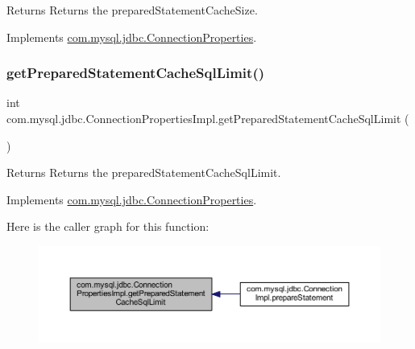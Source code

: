 \begin{DoxyReturn}{Returns}
Returns the prepared\+Statement\+Cache\+Size. 
\end{DoxyReturn}


Implements \mbox{\hyperlink{interfacecom_1_1mysql_1_1jdbc_1_1_connection_properties_ad0bf062f59dcc82790e2d539c3a79924}{com.\+mysql.\+jdbc.\+Connection\+Properties}}.

\mbox{\label{classcom_1_1mysql_1_1jdbc_1_1_connection_properties_impl_a5470990923e677d14d3bfb985b7f2e6d}} 
\subsubsection{\texorpdfstring{get\+Prepared\+Statement\+Cache\+Sql\+Limit()}{getPreparedStatementCacheSqlLimit()}}
{\footnotesize\ttfamily int com.\+mysql.\+jdbc.\+Connection\+Properties\+Impl.\+get\+Prepared\+Statement\+Cache\+Sql\+Limit (\begin{DoxyParamCaption}{ }\end{DoxyParamCaption})}

\begin{DoxyReturn}{Returns}
Returns the prepared\+Statement\+Cache\+Sql\+Limit. 
\end{DoxyReturn}


Implements \mbox{\hyperlink{interfacecom_1_1mysql_1_1jdbc_1_1_connection_properties_a4bcee0f0e555dcada01589d7b4168a4e}{com.\+mysql.\+jdbc.\+Connection\+Properties}}.

Here is the caller graph for this function\+:\nopagebreak
\begin{figure}[H]
\begin{center}
\leavevmode
\includegraphics[width=350pt]{classcom_1_1mysql_1_1jdbc_1_1_connection_properties_impl_a5470990923e677d14d3bfb985b7f2e6d_icgraph}
\end{center}
\end{figure}
\mbox{\label{classcom_1_1mysql_1_1jdbc_1_1_connection_properties_impl_a8996c90f639a9d9223f7ffe0124e1129}} 
